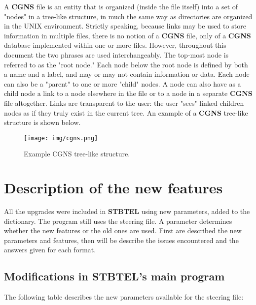 \documentclass[a4paper,10pt]{article}
\newcommand{\stb}{\textbf{STBTEL}\xspace}
\newcommand{\cgns}{\textbf{CGNS}\xspace}
\begin{document}
A \cgns file is an entity that is organized (inside the file itself) into a set
of "nodes" in a tree-like structure, in much the same way as directories are
organized in the UNIX environment.  Strictly speaking, because links may be
used to store information in multiple files, there is no notion of a \cgns
file, only of a \cgns database implemented within one or more files.  However,
throughout this document the two phrases are used interchangeably. The top-most
node is referred to as the "root node." Each node below the root node is
defined by both a name and a label, and may or may not contain information or
data. Each node can also be a "parent" to one or more "child" nodes.  A node
can also have as a child node a link to a node elsewhere in the file or to a
node in a separate \cgns file altogether. Links are transparent to the user:
the user "sees" linked children nodes as if they truly exist in the current
tree. An example of a \cgns tree-like structure is shown below.

\begin{figure} [ht]
\centering
\texttt{[image: img/cgns.png]}
\caption{Example CGNS tree-like structure.}
\end{figure}


\section{\label{upgrades}Description of the new features}

All the upgrades were included in \stb using new parameters, added to the
dictionary. The program still uses the steering file. A parameter determines
whether the new features or the old ones are used.  First are described the new
parameters and features, then will be describe the issues encountered and the
answers given for each format.

\subsection{Modifications in \stb's main program}

The following table describes the new parameters available for the steering
file:\\
\end{document}
